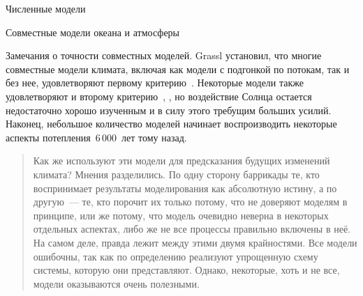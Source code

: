 \begin{chapter}{Численные модели}
\begin{section}{Совместные модели океана и атмосферы}
\begin{paragraph}{Замечания о точности совместных моделей.}
Grassl установил, что многие совместные модели климата, включая как модели
с подгонкой по потокам,
так и без нее, удовлетворяют первому критерию~\cite{Grassl:2000}. Некоторые
модели также удовлетворяют и второму критерию~\cite{Smith:2002}, \cite{Stott:2000}, 
но воздействие Солнца остается недостаточно хорошо изученным и в силу этого
требущим больших усилий. Наконец, небольшое количество моделей начинает
воспроизводить некоторые аспекты потепления~$6\,000$~лет тому назад. 
%
\begin{quote}
Как же используют эти модели для предсказания будущих изменений
климата? Мнения разделились. По одну сторону баррикады те, кто
воспринимает результаты моделирования как абсолютную истину, а по другую~---
те, кто порочит их только потому, что не доверяют моделям
в принципе, или же потому, что модель очевидно неверна в некоторых 
отдельных аспектах, либо же не все процессы правильно включены в неё. 
На самом деле, правда лежит между этими двумя крайностями. 
Все модели ошибочны, так как по определению реализуют упрощенную схему 
системы, которую они
представляют. Однако, некоторые, хоть и не все, модели оказываются очень 
полезными.~\cite{Trenberth:1997a} 
%
\end{quote}
\end{paragraph}
\end{section}


\end{chapter}
